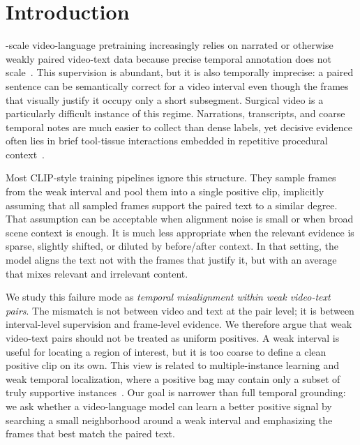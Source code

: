 \section{Introduction}

-scale video-language pretraining increasingly relies on narrated or otherwise weakly paired video-text data because precise temporal annotation does not scale~\cite{miech2019howto100m,pan2022hdvila,xu2023procedure_aware_repr,zhou2023procedure_aware_pretraining}. This supervision is abundant, but it is also temporally imprecise: a paired sentence can be semantically correct for a video interval even though the frames that visually justify it occupy only a short subsegment. Surgical video is a particularly difficult instance of this regime. Narrations, transcripts, and coarse temporal notes are much easier to collect than dense labels, yet decisive evidence often lies in brief tool-tissue interactions embedded in repetitive procedural context~\cite{lecturevideo2023,peskavlp2024,surglavi2025}.

Most CLIP-style training pipelines ignore this structure. They sample frames from the weak interval and pool them into a single positive clip, implicitly assuming that all sampled frames support the paired text to a similar degree. That assumption can be acceptable when alignment noise is small or when broad scene context is enough. It is much less appropriate when the relevant evidence is sparse, slightly shifted, or diluted by before/after context. In that setting, the model aligns the text not with the frames that justify it, but with an average that mixes relevant and irrelevant content.

We study this failure mode as \emph{temporal misalignment within weak video-text pairs}. The mismatch is not between video and text at the pair level; it is between interval-level supervision and frame-level evidence. We therefore argue that weak video-text pairs should not be treated as uniform positives. A weak interval is useful for locating a region of interest, but it is too coarse to define a clean positive clip on its own. This view is related to multiple-instance learning and weak temporal localization, where a positive bag may contain only a subset of truly supportive instances~\cite{dietterich1997mil,ilse2018attentionmil,shen2021dwsa,li2023boostingwtal,hu2024mmplateau,li2024fps}. Our goal is narrower than full temporal grounding: we ask whether a video-language model can learn a better positive signal by searching a small neighborhood around a weak interval and emphasizing the frames that best match the paired text.

